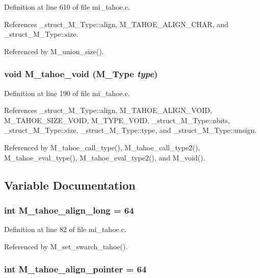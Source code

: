 Definition at line 610 of file mi\_\-tahoe.c.

References \_\-struct\_\-M\_\-Type::align, M\_\-TAHOE\_\-ALIGN\_\-CHAR, and \_\-struct\_\-M\_\-Type::size.

Referenced by M\_\-union\_\-size().
\subsubsection{\setlength{\rightskip}{0pt plus 5cm}void M\_\-tahoe\_\-void (\bf{M\_\-Type} {\em type})}\label{mi__tahoe_8c_d615fccd186804ec8b7fa8bdce96a550}




Definition at line 190 of file mi\_\-tahoe.c.

References \_\-struct\_\-M\_\-Type::align, M\_\-TAHOE\_\-ALIGN\_\-VOID, M\_\-TAHOE\_\-SIZE\_\-VOID, M\_\-TYPE\_\-VOID, \_\-struct\_\-M\_\-Type::nbits, \_\-struct\_\-M\_\-Type::size, \_\-struct\_\-M\_\-Type::type, and \_\-struct\_\-M\_\-Type::unsign.

Referenced by M\_\-tahoe\_\-call\_\-type(), M\_\-tahoe\_\-call\_\-type2(), M\_\-tahoe\_\-eval\_\-type(), M\_\-tahoe\_\-eval\_\-type2(), and M\_\-void().

\subsection{Variable Documentation}
\subsubsection{\setlength{\rightskip}{0pt plus 5cm}int \bf{M\_\-tahoe\_\-align\_\-long} = 64}\label{mi__tahoe_8c_5696ac06dd2f0a1a64528469a44e5e67}




Definition at line 82 of file mi\_\-tahoe.c.

Referenced by M\_\-set\_\-swarch\_\-tahoe().
\subsubsection{\setlength{\rightskip}{0pt plus 5cm}int \bf{M\_\-tahoe\_\-align\_\-pointer} = 64}\label{mi__tahoe_8c_33c21a40cd7467ea8bb49965b655456d}




